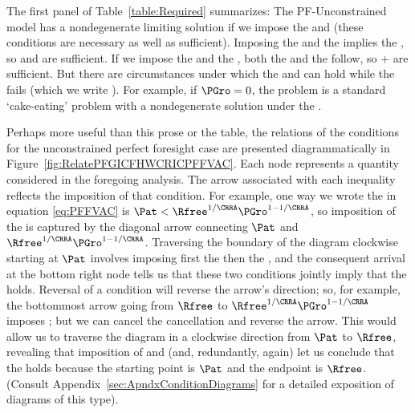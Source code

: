 \documentclass[BufferStockTheory]{subfiles}
\begin{document}
The first panel of Table~\ref{table:Required} summarizes:  The PF-Unconstrained model has a nondegenerate limiting solution if we impose the {\RIC} and {\FHWC} (these conditions are necessary as well as sufficient).  Imposing the {\PFFVAC} and the {\FHWC} implies the {\RIC}, so {\PFFVAC} and {\FHWC} are sufficient.  If we impose the {\GIC} and the {\FHWC}, both the {\PFFVAC} and the {\RIC} follow, so {\GIC}+{\FHWC} are sufficient.  But there are circumstances under which the {\RIC} and {\FHWC} can hold while the {\PFFVAC} fails (which we write \cncl{\PFFVAC}).  For example, if $\PGro=0$, the problem is a standard `cake-eating' problem with a nondegenerate solution under the {\RIC}.%

Perhaps more useful than this prose or the table,  the relations of the conditions for the unconstrained perfect foresight case are presented diagrammatically in Figure~\ref{fig:RelatePFGICFHWCRICPFFVAC}.  Each node represents a quantity considered in the foregoing analysis.  The arrow associated with each inequality reflects the imposition of that condition.  For example, one way we wrote the {\PFFVAC} in equation \eqref{eq:PFFVAC} is $\Pat < \Rfree^{1/\CRRA} \PGro^{1-1/\CRRA}$, so imposition of the {\PFFVAC} is captured by the diagonal arrow connecting $\Pat$ and $\Rfree^{1/\CRRA}\PGro^{1-1/\CRRA}$.  Traversing the boundary of the diagram clockwise starting at $\Pat$ involves imposing first the {\GICAbs} then the {\FHWC}, and the consequent arrival at the bottom right node tells us that these two conditions jointly imply that the {\PFFVAC} holds.  Reversal of a condition will reverse the arrow's direction; so, for example, the bottommost arrow going from $\Rfree$ to $\Rfree^{1/\CRRA}\PGro^{1-1/\CRRA}$ imposes {\cncl{\FHWC}}; but we can cancel the cancellation and reverse the arrow.  This would allow us to traverse the diagram in a clockwise direction from $\Pat$ to $\Rfree$, revealing that imposition of {\GICAbs} and {\FHWC} (and, redundantly, {\FHWC} again) let us conclude that the {\RIC} holds because the starting point is $\Pat$ and the endpoint is $\Rfree$.  (Consult Appendix~\ref{sec:ApndxConditionDiagrams} for a detailed exposition of diagrams of this type).
\end{document}
